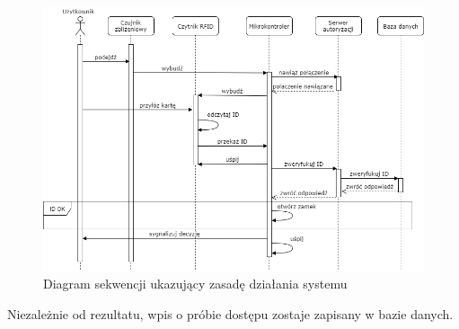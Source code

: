                 \begin{figure}[]
                        \includegraphics[width=\linewidth]{chapters/images/sequence1.png}
                        \caption{Diagram sekwencji ukazujący zasadę działania systemu}
                        \label{fig:sequence1}
                \end{figure}

                Niezależnie od rezultatu, wpis o próbie dostępu zostaje zapisany w bazie danych.

